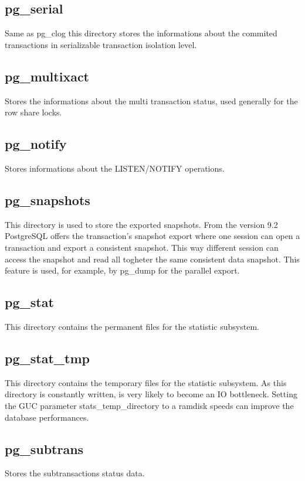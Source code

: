 \subsection{pg\_serial}
Same as pg\_clog this directory stores the informations about the commited 
transactions in serializable transaction isolation level.

\subsection{pg\_multixact}
Stores the informations about the multi transaction status, used generally for  
the row share locks.

\subsection{pg\_notify}
Stores informations about the LISTEN/NOTIFY operations.

\subsection{pg\_snapshots}
This directory is used to store the exported snapshots. From the version 9.2 
PostgreSQL offers the transaction's snapshot export where one session can 
open a transaction and export a consistent snapshot. This way different session 
can access the snapshot and read all togheter the same consistent data 
snapshot. This feature is used, for example, by pg\_dump for the parallel 
export.

\subsection{pg\_stat}
This directory contains the permanent files for the statistic subsystem. 

\subsection{pg\_stat\_tmp}
This directory contains the temporary files for the statistic subsystem. 
As this directory is constantly written, is very likely to become an 
IO bottleneck. Setting the GUC parameter stats\_temp\_directory to a ramdisk 
speeds can improve the database performances.


\subsection{pg\_subtrans}
Stores the subtransactions status data. 

